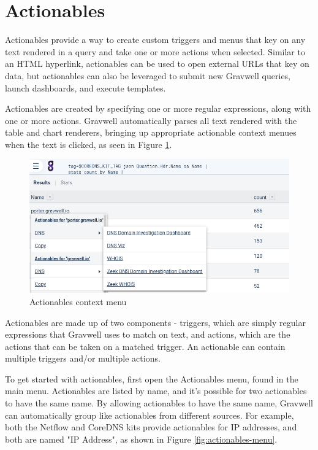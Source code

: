 \clearpage
\section{Actionables}
\label{sec:actionables}
Actionables provide a way to create custom triggers and menus that key on any text rendered in a query and take one or more actions when selected. Similar to an HTML hyperlink, actionables can be used to open external URLs that key on data, but actionables can also be leveraged to submit new Gravwell queries, launch dashboards, and execute templates.

Actionables are created by specifying one or more regular expressions, along with one or more actions. Gravwell automatically parses all text rendered with the table and chart renderers, bringing up appropriate actionable context menues when the text is clicked, as seen in Figure \ref{fig:actionables-overview}.

\begin{figure}
	\includegraphics[width=0.7\linewidth]{images/actionables-overview.png}
	\caption{Actionables context menu}
	\label{fig:actionables-overview}
\end{figure}

Actionables are made up of two components - triggers, which are simply regular expressions that Gravwell uses to match on text, and actions, which are the actions that can be taken on a matched trigger. An actionable can contain multiple triggers and/or multiple actions.

To get started with actionables, first open the Actionables menu, found in the main menu. Actionables are listed by name, and it's possible for two actionables to have the same name. By allowing actionables to have the same name, Gravwell can automatically group like actionables from different sources. For example, both the Netflow and CoreDNS kits provide actionables for IP addresses, and both are named "IP Address", as shown in Figure \ref{fig:actionables-menu}.


